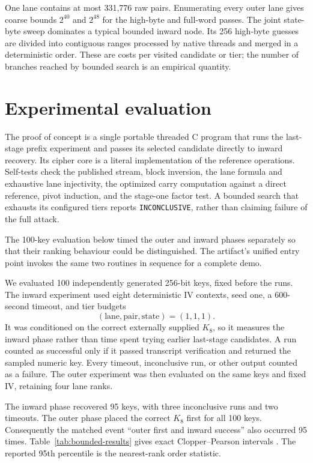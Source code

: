 \documentclass[10pt]{article}
\theoremstyle{plain}
\theoremstyle{definition}
\theoremstyle{remark}
\newcommand{\code}[1]{\texttt{#1}}
\begin{document}
One lane contains at most 331,776 raw pairs.  Enumerating every outer lane
gives coarse bounds \(2^{40}\) and \(2^{48}\) for the high-byte and full-word
passes.  The joint state-byte sweep dominates a typical bounded inward node.
Its 256 high-byte guesses are divided into contiguous ranges processed by
native threads and merged in a deterministic order.  These are costs per
visited candidate or tier; the number of branches reached by bounded search
is an empirical quantity.

\section{Experimental evaluation}
\label{sec:experiments}

The proof of concept is a single portable threaded C program that runs the
last-stage prefix experiment and passes its selected candidate directly to
inward recovery.  Its cipher core is a literal implementation of the reference
operations.  Self-tests
check the published stream, block inversion, the lane formula and exhaustive
lane injectivity, the optimized carry computation against a direct reference,
pivot induction, and the stage-one factor test.  A bounded search that exhausts
its configured tiers reports \code{INCONCLUSIVE}, rather than claiming
failure of the full attack.

The 100-key evaluation below timed the outer and inward phases separately so
that their ranking behaviour could be distinguished.  The artifact's unified
entry point invokes the same two routines in sequence for a complete demo.

We evaluated 100 independently generated 256-bit keys, fixed before the runs.
The inward experiment used eight deterministic IV contexts, seed one, a
600-second timeout, and tier budgets
\[
(\text{lane},\text{pair},\text{state})=(1,1,1).
\]
It was conditioned on the correct externally supplied \(K_8\), so it measures
the inward phase rather than time spent trying earlier last-stage candidates.
A run counted as successful only if it passed transcript verification and
returned the sampled numeric key.  Every timeout, inconclusive run, or other
output counted as a failure.  The outer experiment was then evaluated on the
same keys and fixed IV, retaining four lane ranks.

The inward phase recovered 95 keys, with three inconclusive runs and two
timeouts.  The outer phase placed the correct \(K_8\) first for all 100 keys.
Consequently the matched event ``outer first and inward success'' also
occurred 95 times.  Table~\ref{tab:bounded-results} gives exact
Clopper--Pearson intervals \cite{ClopperPearson1934}.  The reported 95th
percentile is the nearest-rank order statistic.
\end{document}
